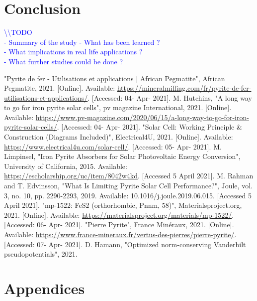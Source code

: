 \documentclass[11pt,a4paper]{article}
\begin{document}
\section{Conclusion}
\textcolor{blue}{
\textbackslash\textbackslash TODO\\
- Summary of the study
- What has been learned ? \\
- What implications in real life applications ?\\
- What further studies could be done ?}
\newpage
\begin{thebibliography}{00}
 "Pyrite de fer - Utilisations et applications | African Pegmatite", African Pegmatite, 2021. [Online]. Available: \url{https://mineralmilling.com/fr/pyrite-de-fer-utilisations-et-applications/}. [Accessed: 04- Apr- 2021].
 M. Hutchins, "A long way to go for iron pyrite solar cells", pv magazine International, 2021. [Online]. Available: \url{https://www.pv-magazine.com/2020/06/15/a-long-way-to-go-for-iron-pyrite-solar-cells/}. [Accessed: 04- Apr- 2021].
 "Solar Cell: Working Principle \& Construction (Diagrams Included)", Electrical4U, 2021. [Online]. Available: \url{https://www.electrical4u.com/solar-cell/}. [Accessed: 05- Apr- 2021].
 M. Limpinsel, "Iron Pyrite Absorbers for Solar Photovoltaic Energy Conversion", University of California, 2015. Available: \url{https://escholarship.org/uc/item/8042w4kd}. [Accessed 5 April 2021].
 M. Rahman and T. Edvinsson, "What Is Limiting Pyrite Solar Cell Performance?", Joule, vol. 3, no. 10, pp. 2290-2293, 2019. Available: 10.1016/j.joule.2019.06.015. [Accessed 5 April 2021].
 "mp-1522: FeS2 (orthorhombic, Pnnm, 58)", Materialsproject.org, 2021. [Online]. Available: \url{https://materialsproject.org/materials/mp-1522/}. [Accessed: 06- Apr- 2021].
"Pierre Pyrite", France Minéraux, 2021. [Online]. Available: \url{https://www.france-mineraux.fr/vertus-des-pierres/pierre-pyrite/}. [Accessed: 07- Apr- 2021].
 D. Hamann, "Optimized norm-conserving Vanderbilt pseudopotentials", 2021.
\end{thebibliography}
\newpage
\section{Appendices}
\end{document}
